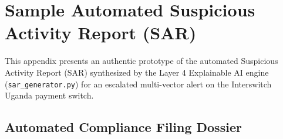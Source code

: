 \chapter{Sample Automated Suspicious Activity Report (SAR)} \label{app:sar_sample}

This appendix presents an authentic prototype of the automated Suspicious Activity Report (SAR) synthesized by the Layer 4 Explainable AI engine (\texttt{sar\_generator.py}) for an escalated multi-vector alert on the Interswitch Uganda payment switch.

\section{Automated Compliance Filing Dossier}

